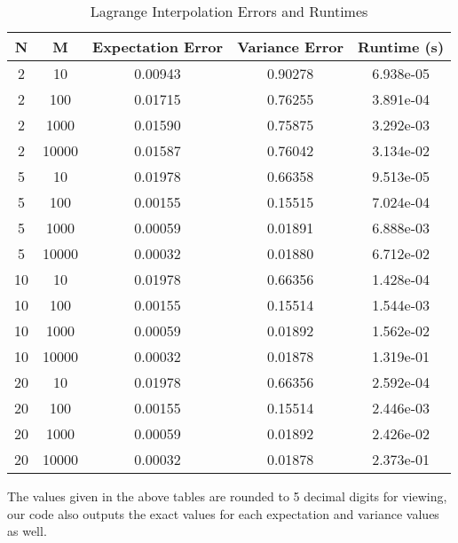 \documentclass{article}
\begin{document}
    \begin{table}[ht]
        \centering
        \begin{tabular}{|c|c|c|c|c|}
        \hline
        \textbf{N} & \textbf{M} & \textbf{Expectation Error} & \textbf{Variance Error} & \textbf{Runtime (s)} \\ \hline
        2 & 10 & 0.00943 & 0.90278 & 6.938e-05 \\ \hline
        2 & 100 & 0.01715 & 0.76255 & 3.891e-04 \\ \hline
        2 & 1000 & 0.01590 & 0.75875 & 3.292e-03 \\ \hline
        2 & 10000 & 0.01587 & 0.76042 & 3.134e-02 \\ \hline
        5 & 10 & 0.01978 & 0.66358 & 9.513e-05 \\ \hline
        5 & 100 & 0.00155 & 0.15515 & 7.024e-04 \\ \hline
        5 & 1000 & 0.00059 & 0.01891 & 6.888e-03 \\ \hline
        5 & 10000 & 0.00032 & 0.01880 & 6.712e-02 \\ \hline
        10 & 10 & 0.01978 & 0.66356 & 1.428e-04 \\ \hline
        10 & 100 & 0.00155 & 0.15514 & 1.544e-03 \\ \hline
        10 & 1000 & 0.00059 & 0.01892 & 1.562e-02 \\ \hline
        10 & 10000 & 0.00032 & 0.01878 & 1.319e-01 \\ \hline
        20 & 10 & 0.01978 & 0.66356 & 2.592e-04 \\ \hline
        20 & 100 & 0.00155 & 0.15514 & 2.446e-03 \\ \hline
        20 & 1000 & 0.00059 & 0.01892 & 2.426e-02 \\ \hline
        20 & 10000 & 0.00032 & 0.01878 & 2.373e-01 \\ \hline
        \end{tabular}
        \caption{Lagrange Interpolation Errors and Runtimes}
        \label{table:lagrange_combined}
        \end{table}
The values given in the above tables are rounded to 5 decimal digits for viewing, our code also outputs the 
exact values for each expectation and variance values as well. 
\end{document}
